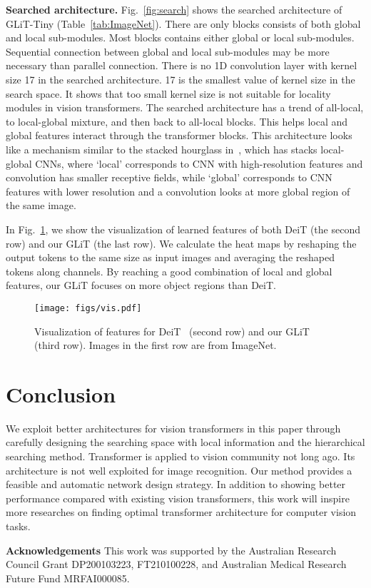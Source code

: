 \documentclass[10pt,twocolumn,letterpaper]{article}
\begin{document}
\noindent \textbf{Searched architecture.}
Fig.~\ref{fig:search} shows the searched architecture of GLiT-Tiny (Table~\ref{tab:ImageNet}). There are only  blocks consists of both global and local sub-modules. Most blocks contains either global or local sub-modules. Sequential connection between global and local sub-modules may be more necessary than parallel connection. There is no 1D convolution layer with kernel size 17 in the searched architecture. 17 is the smallest value of kernel size in the search space. It shows that too small kernel size is not suitable for locality modules in vision transformers. The searched architecture has a trend of all-local, to local-global mixture, and then back to all-local blocks. This helps local and global features interact through the transformer blocks. This architecture looks like a mechanism similar to the stacked hourglass in~\cite{hourglass}, which has stacks local-global CNNs, where `local' corresponds to CNN with high-resolution features and  convolution has smaller receptive fields, while `global' corresponds to CNN features with lower resolution and a  convolution looks at more global region of the same image.

In Fig.~\ref{fig:vis}, we show the visualization of learned features of both DeiT (the second row) and our GLiT (the last row). We calculate the heat maps by reshaping the output tokens to the same size as input images and averaging the reshaped tokens along channels. By reaching a good combination of local and global features, our GLiT focuses on more object regions than DeiT. 

\begin{figure}[t]
	\centering
	\texttt{[image: figs/vis.pdf]}\\
	\caption{Visualization of features for DeiT~\cite{deit} (second row) and our GLiT (third row). Images in the first row are from ImageNet.
	}

	\label{fig:vis}
	 \vspace{-16pt}
\end{figure}


\section{Conclusion}
We exploit better architectures for vision transformers in this paper through carefully designing the searching space with local information and the hierarchical searching method. Transformer is applied to vision community not long ago. Its architecture is not well exploited for image recognition. Our method provides a feasible and automatic network design strategy. In addition to showing better performance compared with existing vision transformers, this work will inspire more researches on finding optimal transformer architecture for computer vision tasks.

{\flushleft\textbf{Acknowledgements}}
This work was supported by the Australian Research Council Grant DP200103223, FT210100228, and Australian Medical Research Future Fund MRFAI000085.

{\small


}
\end{document}
